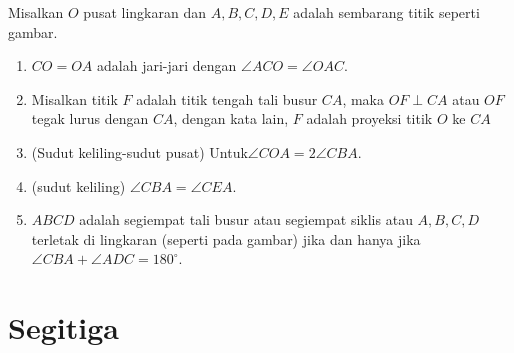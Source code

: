 \documentclass[11pt]{scrartcl}
\begin{document}
Misalkan $O$ pusat lingkaran dan $A,B,C,D,E$ adalah sembarang titik seperti gambar.
\begin{enumerate}
    \item $CO=OA$ adalah jari-jari dengan $\angle ACO = \angle OAC$.
    \item Misalkan titik $F$ adalah titik tengah tali busur $CA$, maka $OF \perp CA$ atau $OF$ tegak lurus dengan $CA$, dengan kata lain, $F$ adalah proyeksi titik $O$ ke $CA$
    \item (Sudut keliling-sudut pusat) Untuk$\angle COA = 2\angle CBA$.
    \item (sudut keliling) $\angle CBA = \angle CEA$.
    \item $ABCD$ adalah segiempat tali busur atau segiempat siklis  atau $A,B,C,D$ terletak di lingkaran (seperti pada gambar) jika dan hanya jika $\angle CBA + \angle ADC = 180^\circ$.
\end{enumerate}

\section{Segitiga}
\end{document}
